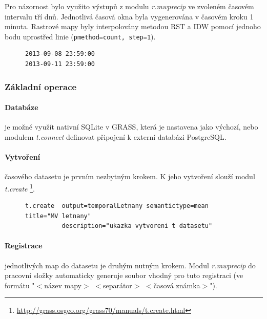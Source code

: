 \documentclass[a4paper,12pt,oneside]{report}
\begin{document}
Pro názornost bylo využito výstupů z modulu \textit{r.mwprecip} ve
zvoleném časovém intervalu tří dnů. Jednotlivá časová okna byla
vygenerována v časovém kroku 1 minuta.  Rastrové mapy byly
interpolovány metodou RST a IDW pomocí jednoho bodu uprostřed linie
(\texttt{pmethod=count, step=1}).
\begin{figure}[h!]
\begin{footnotesize}
\lstset{extendedchars=false,
escapeinside=''}
\begin{lstlisting}[style=mybash]
2013-09-08 23:59:00
2013-09-11 23:59:00                       
\end{lstlisting}
\end{footnotesize} 
\end{figure}


\subsubsection{Základní operace}

\paragraph*{Databáze} je možné využít nativní SQLite v GRASS, která je
nastavena jako výchozí, nebo modulem \textit{t.connect} definovat
připojení k externí databázi PostgreSQL.

\paragraph*{Vytvoření } časového datasetu je prvním nezbytným
krokem. K jeho vytvoření slouží modul \textit{t.create}
\footnote{\url{http://grass.osgeo.org/grass70/manuals/t.create.html}}.
\begin{figure}[h!]
\begin{footnotesize}
\lstset{extendedchars=false,
escapeinside=''}
\begin{lstlisting}[style=mybash]
t.create  output=temporalLetnany semantictype=mean title="MV letnany"
          description="ukazka vytvoreni t datasetu"                        
\end{lstlisting}
\end{footnotesize} 
\end{figure}

\paragraph*{Registrace} jednotlivých map do datasetu je druhým nutným
krokem. Modul \textit{r.mwprecip} do pracovní složky automaticky
generuje soubor vhodný pro tuto registraci (ve formátu "$<$název
mapy$>$ $<$separátor$>$ $<$časová známka$>$").
\end{document}
